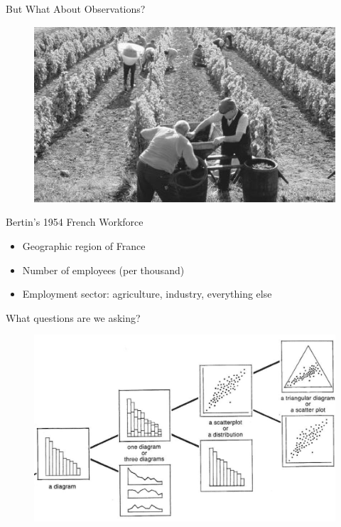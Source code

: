 \documentclass[xcolor={dvipsnames}]{beamer}
\begin{document}
\begin{frame}{But What About Observations?}
\begin{figure}
\includegraphics[width=\textwidth]{figs/ctc_02_img0397.jpg}
\end{figure}
\end{frame}

\begin{frame}{Bertin's 1954 French Workforce\cite{bertin_semiology_2011}}
\begin{itemize}
    \item Geographic region of France
    \item Number of employees (per thousand)
    \item Employment sector: agriculture, industry, everything else
\end{itemize}
\end{frame}

\begin{frame}{What questions are we asking?}
\begin{figure}
\includegraphics[width=\textwidth]{figs/chart_chooser_top.png}
\end{figure}
\end{frame}
\end{document}
